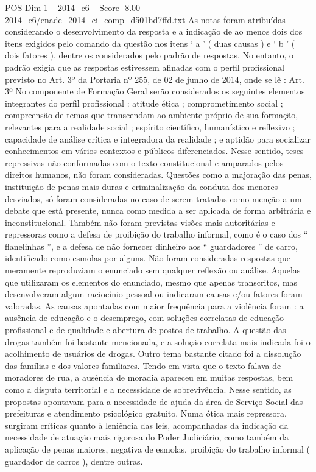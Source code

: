 \begin{textsample}{POS Dim 1 – 2014\_c6 – Score -8.00 – 2014\_c6/enade\_2014\_ci\_comp\_d501bd7ffd.txt}
As notas foram atribuídas considerando o desenvolvimento da resposta e a indicação de ao menos dois dos itens exigidos pelo comando da questão nos itens ‘ a ’ ( duas causas ) e ‘ b ’ ( dois fatores ), dentre os considerados pelo padrão de respostas.
No entanto, o padrão exigia que as respostas estivessem afinadas com o perfil profissional previsto no Art. 3º da Portaria nº 255, de 02 de junho de 2014, onde se lê : Art. 3º No componente de Formação Geral serão considerados os seguintes elementos integrantes do perfil profissional : atitude ética ; comprometimento social ; compreensão de temas que transcendam ao ambiente próprio de sua formação, relevantes para a realidade social ; espírito científico, humanístico e reflexivo ; capacidade de análise crítica e integradora da realidade ; e aptidão para socializar conhecimentos em vários contextos e públicos diferenciados.
Nesse sentido, teses repressivas não conformadas com o texto constitucional e amparados pelos direitos humanos, não foram consideradas.
Questões como a majoração das penas, instituição de penas mais duras e criminalização da conduta dos menores desviados, só foram consideradas no caso de serem tratadas como menção a um debate que está presente, nunca como medida a ser aplicada de forma arbitrária e inconstitucional.
Também não foram previstas visões mais autoritárias e repressoras como a defesa de proibição do trabalho informal, como é o caso dos “ flanelinhas ”, e a defesa de não fornecer dinheiro aos “ guardadores ” de carro, identificado como esmolas por alguns.
Não foram consideradas respostas que meramente reproduziam o enunciado sem qualquer reflexão ou análise.
Aquelas que utilizaram os elementos do enunciado, mesmo que apenas transcritos, mas desenvolveram algum raciocínio pessoal ou indicaram causas e/ou fatores foram valoradas.
As causas apontadas com maior frequência para a violência foram : a ausência de educação e o desemprego, com soluções correlatas de educação profissional e de qualidade e abertura de postos de trabalho.
A questão das drogas também foi bastante mencionada, e a solução correlata mais indicada foi o acolhimento de usuários de drogas.
Outro tema bastante citado foi a dissolução das famílias e dos valores familiares.
Tendo em vista que o texto falava de moradores de rua, a ausência de moradia apareceu em muitas respostas, bem como a disputa territorial e a necessidade de sobrevivência.
Nesse sentido, as propostas apontavam para a necessidade de ajuda da área de Serviço Social das prefeituras e atendimento psicológico gratuito.
Numa ótica mais repressora, surgiram críticas quanto à leniência das leis, acompanhadas da indicação da necessidade de atuação mais rigorosa do Poder Judiciário, como também da aplicação de penas maiores, negativa de esmolas, proibição do trabalho informal ( guardador de carros ), dentre outras.

\end{textsample}
